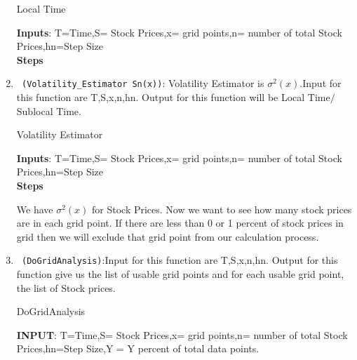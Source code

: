 \begin{enumerate}
  \begin{algorithm}
  \caption{Local Time}
  \bigskip
  \textbf{Inputs}: T=Time,S= Stock Prices,x= grid points,n= number of total Stock Prices,hn=Step Size\\
  \textbf{Steps}
  \end{algorithm}
  \item \verb! (Volatility_Estimator Sn(x))!: Volatility Estimator is $\sigma^2(x)$.Input for this function are T,S,x,n,hn.
 Output for this function will be Local Time$/$Sublocal Time.
  \begin{algorithm}
  \caption{Volatility Estimator}
  \bigskip
  \textbf{Inputs}: T=Time,S= Stock Prices,x= grid points,n= number of total Stock Prices,hn=Step Size\\
  \textbf{Steps}
  \end{algorithm}
 We have $\sigma^2(x)$ for Stock Prices. Now we want to see how many stock prices are in each grid point. 
 If there are less than 0 or 1 percent of stock prices in grid then we will exclude that grid point from
 our calculation process.
 \item \verb! (DoGridAnalysis)!:Input for this function are T,S,x,n,hn.
 Output for this function give us the list of usable grid points and for each usable grid point, the list of Stock prices.
  \begin{algorithm}
  \caption{DoGridAnalysis}
  \bigskip
  \textbf{INPUT}: T=Time,S= Stock Prices,x= grid points,n= number of total Stock Prices,hn=Step Size,Y = Y percent of total data points.\\

\end{algorithm}
\end{enumerate}

